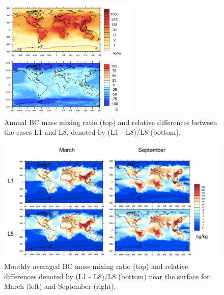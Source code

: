 \documentclass[12pt, fullpage]{uiucthesis2009_2}
\begin{document}
	\begin{figure}[h] 
		\begin{center}
			\includegraphics[width = 0.6\textwidth]{Figure13}
			\caption[Annually averaged BC mass mixing ratio (top) and relative differences denoted by (L1 - L8)/L8 (bottom)]{\label{fig_P13} Annual BC mass mixing ratio (top) and relative differences between the cases L1 and L8, denoted by (L1 - L8)/L8 (bottom).}
		\end{center}
	\end{figure}
	
	\begin{figure}[h] 
			\begin{center}
				\includegraphics[width = 1\textwidth]{Figure21}
				\caption[Monthly averaged BC mass mixing ratio (top) and relative differences denoted by (L1 - L8)/L8 (bottom) near the surface for March (left) and September (right).]{\label{fig_P21} Monthly averaged BC mass mixing ratio (top) and relative differences denoted by (L1 - L8)/L8 (bottom) near the surface for March (left) and September (right).}
			\end{center}
		\end{figure}
	
\end{document}
